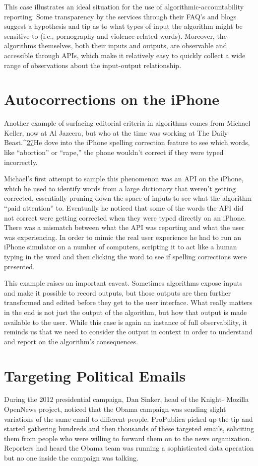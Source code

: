 This case illustrates an ideal situation for the use of algorithmic-accountability reporting. Some transparency by the services through their FAQ's and blogs suggest a hypothesis and tip as to what types of input the algorithm might be sensitive to (i.e., pornography and violence-related words). Moreover, the algorithms themselves, both their inputs and outputs, are observable and accessible through APIs, which make it relatively easy to quickly collect a wide range of observations about the input-output relationship. 

\section{Autocorrections on the iPhone }
Another example of surfacing editorial criteria in algorithms comes from Michael Keller, now at Al Jazeera, but who at the time was working at The Daily Beast.^{\href{#endnotes}{27}}He dove into the iPhone spelling correction feature to see which words, like ``abortion'' or ``rape,'' the phone wouldn't correct if they were typed incorrectly. 

Michael's first attempt to sample this phenomenon was an API on the iPhone, which he used to identify words from a large dictionary that weren't getting corrected, essentially pruning down the space of inputs to see what the algorithm ``paid attention'' to. Eventually he noticed that some of the words the API did not correct were getting corrected when they were typed directly on an iPhone. There was a mismatch between what the API was reporting and what the user was experiencing. In order to mimic the real user experience he had to run an iPhone simulator on a number of computers, scripting it to act like a human typing in the word and then clicking the word to see if spelling corrections were presented. 

This example raises an important caveat. Sometimes algorithms expose inputs and make it possible to record outputs, but those outputs are then further transformed and edited before they get to the user interface. What really matters in the end is not just the output of the algorithm, but how that output is made available to the user. While this case is again an instance of full observability, it reminds us that we need to consider the output in context in order to understand and report on the algorithm's consequences. 

\section{Targeting Political Emails }
During the 2012 presidential campaign, Dan Sinker, head of the Knight- Mozilla OpenNews project, noticed that the Obama campaign was sending slight variations of the same email to different people. ProPublica picked up the tip and started gathering hundreds and then thousands of these targeted emails, soliciting them from people who were willing to forward them on to the news organization. Reporters had heard the Obama team was running a sophisticated data operation but no one inside the campaign was talking. 

